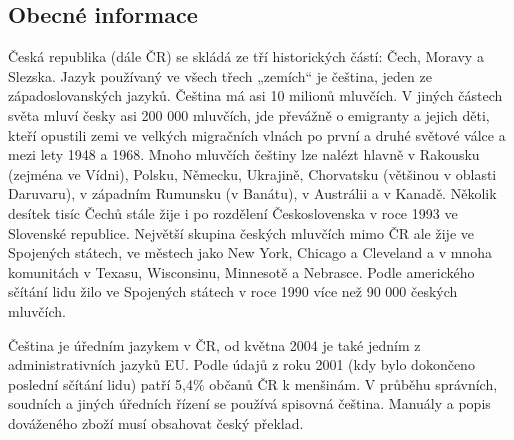 \documentclass[]{../../metanetpaper}
\begin{document}

\begin{multicols}{2}
  \subsection{Obecné informace}

Česká republika (dále ČR) se skládá ze tří historických částí: Čech, Moravy a Slezska. Jazyk používaný ve všech třech „zemích“ je čeština, jeden ze západoslovanských jazyků. Čeština má asi 10 milionů mluvčích.\cite{Note1_cs} V jiných částech světa mluví česky asi 200 000 mluvčích, jde převážně o emigranty a jejich děti, kteří opustili zemi ve velkých migračních vlnách po první a druhé světové válce a mezi lety 1948 a 1968. Mnoho mluvčích češtiny lze nalézt hlavně v Rakousku (zejména ve Vídni), Polsku, Německu, Ukrajině, Chorvatsku (většinou v oblasti Daruvaru), v západním Rumunsku (v Banátu), v Austrálii a v Kanadě. Několik desítek tisíc Čechů stále žije i po rozdělení Československa v roce 1993 ve Slovenské republice. Největší skupina českých mluvčích mimo ČR ale žije ve Spojených státech, ve městech jako New York, Chicago a Cleveland a v mnoha komunitách v Texasu, Wisconsinu, Minnesotě a Nebrasce. Podle amerického sčítání lidu žilo ve Spojených státech v roce 1990 více než 90 000 českých mluvčích.\cite{Note2}

Čeština je úředním jazykem v ČR, od května 2004 je také jedním z administrativních jazyků EU. Podle údajů z roku 2001 (kdy bylo dokončeno poslední sčítání lidu) patří 5,4\% občanů ČR k menšinám. V průběhu správních, soudních a jiných úředních řízení se používá spisovná čeština. Manuály a popis dováženého zboží musí obsahovat český překlad.


\end{multicols}
\end{document}
